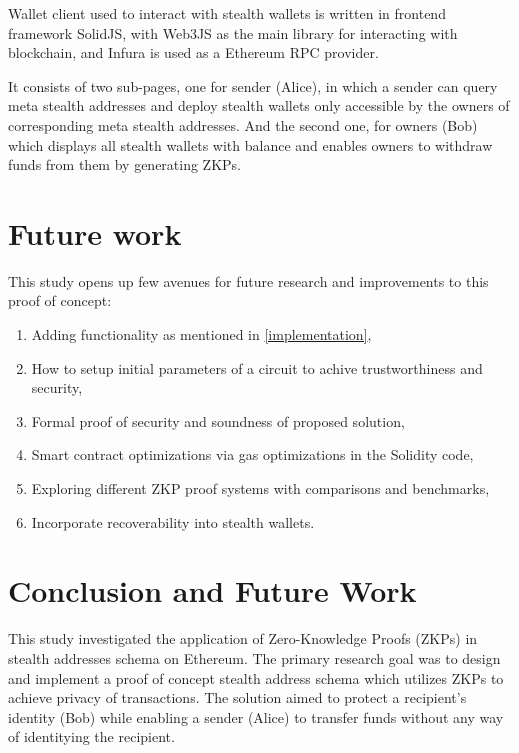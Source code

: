 \documentclass[conference,comsoc,10pt]{IEEEtran}
\begin{document}
        Wallet client used to interact with stealth wallets is written in
        frontend framework SolidJS\cite{solidjs}, with Web3JS\cite{web3js}
        as the main library for interacting with blockchain, and Infura\cite{infura}
        is used as a Ethereum RPC provider.

        It consists of two sub-pages, one for sender (Alice), in which a sender
        can query meta stealth addresses and deploy stealth wallets only accessible
        by the owners of corresponding meta stealth addresses. And the second one,
        for owners (Bob) which displays all stealth wallets with balance and enables
        owners to withdraw funds from them by generating ZKPs.

\section{Future work}
    This study opens up few avenues for future research and improvements
    to this proof of concept:

    \begin{enumerate}
        \item Adding functionality as mentioned in \ref{implementation},
        \item How to setup initial parameters of a circuit to achive trustworthiness
                and security,
        \item Formal proof of security and soundness of proposed solution,
        \item Smart contract optimizations via gas optimizations in the Solidity code,
        \item Exploring different ZKP proof systems with comparisons and benchmarks,
        \item Incorporate recoverability into stealth wallets.
    \end{enumerate}

\section{Conclusion and Future Work}

    This study investigated the application of Zero-Knowledge Proofs (ZKPs)
    in stealth addresses schema on Ethereum. The primary research
    goal was to design and implement a proof of concept stealth address schema
    which utilizes ZKPs to achieve privacy of transactions.
    The solution aimed to protect a recipient's identity (Bob) while enabling
    a sender (Alice) to transfer funds without any way of identitying the
    recipient.
\end{document}
